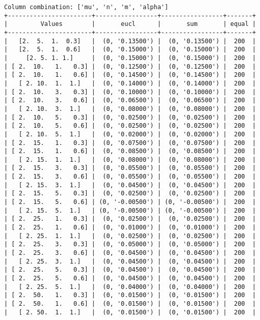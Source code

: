 \documentclass{article}
\begin{document}
\begin{verbatim}
Column combination: ['mu', 'n', 'm', 'alpha']
+-----------------------+-----------------+-----------------+-------+
|         Values        |       eucl      |       sum       | equal |
+-----------------------+-----------------+-----------------+-------+
|   [2.  5.  1.  0.3]   |  (0, '0.13500') |  (0, '0.13500') |  200  |
|   [2.  5.  1.  0.6]   |  (0, '0.15000') |  (0, '0.15000') |  200  |
|     [2. 5. 1. 1.]     |  (0, '0.15000') |  (0, '0.15000') |  200  |
| [ 2.  10.   1.   0.3] |  (0, '0.12500') |  (0, '0.12500') |  200  |
| [ 2.  10.   1.   0.6] |  (0, '0.14500') |  (0, '0.14500') |  200  |
|   [ 2. 10.  1.  1.]   |  (0, '0.14000') |  (0, '0.14000') |  200  |
| [ 2.  10.   3.   0.3] |  (0, '0.10000') |  (0, '0.10000') |  200  |
| [ 2.  10.   3.   0.6] |  (0, '0.06500') |  (0, '0.06500') |  200  |
|   [ 2. 10.  3.  1.]   |  (0, '0.08000') |  (0, '0.08000') |  200  |
| [ 2.  10.   5.   0.3] |  (0, '0.02500') |  (0, '0.02500') |  200  |
| [ 2.  10.   5.   0.6] |  (0, '0.02500') |  (0, '0.02500') |  200  |
|   [ 2. 10.  5.  1.]   |  (0, '0.02000') |  (0, '0.02000') |  200  |
| [ 2.  15.   1.   0.3] |  (0, '0.07500') |  (0, '0.07500') |  200  |
| [ 2.  15.   1.   0.6] |  (0, '0.08500') |  (0, '0.08500') |  200  |
|   [ 2. 15.  1.  1.]   |  (0, '0.08000') |  (0, '0.08000') |  200  |
| [ 2.  15.   3.   0.3] |  (0, '0.05500') |  (0, '0.05500') |  200  |
| [ 2.  15.   3.   0.6] |  (0, '0.05500') |  (0, '0.05500') |  200  |
|   [ 2. 15.  3.  1.]   |  (0, '0.04500') |  (0, '0.04500') |  200  |
| [ 2.  15.   5.   0.3] |  (0, '0.02500') |  (0, '0.02500') |  200  |
| [ 2.  15.   5.   0.6] | (0, '-0.00500') | (0, '-0.00500') |  200  |
|   [ 2. 15.  5.  1.]   | (0, '-0.00500') | (0, '-0.00500') |  200  |
| [ 2.  25.   1.   0.3] |  (0, '0.02500') |  (0, '0.02500') |  200  |
| [ 2.  25.   1.   0.6] |  (0, '0.01000') |  (0, '0.01000') |  200  |
|   [ 2. 25.  1.  1.]   |  (0, '0.02500') |  (0, '0.02500') |  200  |
| [ 2.  25.   3.   0.3] |  (0, '0.05000') |  (0, '0.05000') |  200  |
| [ 2.  25.   3.   0.6] |  (0, '0.04500') |  (0, '0.04500') |  200  |
|   [ 2. 25.  3.  1.]   |  (0, '0.04500') |  (0, '0.04500') |  200  |
| [ 2.  25.   5.   0.3] |  (0, '0.04500') |  (0, '0.04500') |  200  |
| [ 2.  25.   5.   0.6] |  (0, '0.04500') |  (0, '0.04500') |  200  |
|   [ 2. 25.  5.  1.]   |  (0, '0.04000') |  (0, '0.04000') |  200  |
| [ 2.  50.   1.   0.3] |  (0, '0.01500') |  (0, '0.01500') |  200  |
| [ 2.  50.   1.   0.6] |  (0, '0.01500') |  (0, '0.01500') |  200  |
|   [ 2. 50.  1.  1.]   |  (0, '0.01500') |  (0, '0.01500') |  200  |

\end{verbatim}
\end{document}
